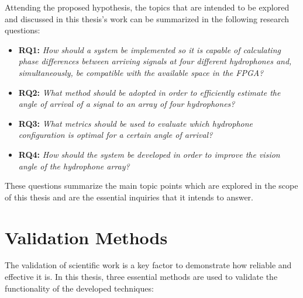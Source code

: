 Attending the proposed hypothesis, the topics that are intended to be explored and discussed in this thesis's work can be summarized in the following research questions:

\begin{itemize}

	\item \textbf{RQ1: }\textit{How should a system be implemented so it is capable of calculating phase differences between arriving signals at four different hydrophones and, simultaneously, be compatible with the available space in the FPGA?}
	
	\item \textbf{RQ2: }\textit{What method should be adopted in order to efficiently estimate the angle of arrival of a signal to an array of four hydrophones?}
	
	\item \textbf{RQ3: }\textit{What metrics should be used to evaluate which hydrophone configuration is optimal for a certain angle of arrival?}
	
	\item \textbf{RQ4: }\textit{How should the system be developed in order to improve the vision angle of the hydrophone array?}
	
\end{itemize}

These questions summarize the main topic points which are explored in the scope of this thesis and are the essential inquiries that it intends to answer.


\section{Validation Methods} \label{sec:validation}

The validation of scientific work is a key factor to demonstrate how reliable and effective it is. In this thesis, three essential methods are used to validate the functionality of the developed techniques:

